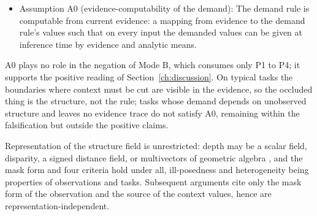 \begin{itemize}
\item Assumption A0 (evidence-computability of the demand): The demand rule is computable from current evidence: a mapping from evidence to the demand rule's values such that on every input the demanded values can be given at inference time by evidence and analytic means.
\end{itemize}

A0 plays no role in the negation of Mode B, which consumes only P1 to P4; it supports the positive reading of Section~\ref{ch:discussion}. On typical tasks the boundaries where context must be cut are visible in the evidence, so the occluded thing is the structure, not the rule; tasks whose demand depends on unobserved structure and leaves no evidence trace do not satisfy A0, remaining within the falsification but outside the positive claims.

Representation of the structure field is unrestricted: depth may be a scalar field, disparity, a signed distance field, or multivectors of geometric algebra \citep{hestenes1984,dorst2007}, and the mask form and four criteria hold under all, ill-posedness and heterogeneity being properties of observations and tasks. Subsequent arguments cite only the mask form of the observation and the source of the context values, hence are representation-independent.
